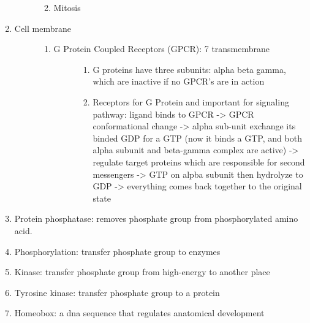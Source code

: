 \documentclass[letterpaper,10pt,english]{sphinxmanual}
\begin{document}
\begin{enumerate}
\begin{description}
\begin{enumerate}
\begin{description}
\begin{enumerate}
\end{enumerate}

\end{description}

\item {} 
Mitosis

\end{enumerate}

\end{description}

\item {} \begin{description}
\item[{Cell membrane}] \leavevmode\begin{enumerate}
\item {} \begin{description}
\item[{G Protein Coupled Receptors (GPCR): 7 transmembrane}] \leavevmode\begin{enumerate}
\item {} 
G proteins have three subunits: alpha beta gamma, which are inactive if no GPCR’s are in action

\item {} 
Receptors for G Protein and important for signaling pathway: ligand binds to GPCR -\textgreater{} GPCR conformational change -\textgreater{} alpha sub-unit exchange its binded GDP for a GTP (now it binds a GTP, and both alpha subunit and beta-gamma complex are active) -\textgreater{} regulate target proteins which are responsible for second messengers -\textgreater{} GTP on alpba subunit then hydrolyze to GDP -\textgreater{} everything comes back together to the original state

\end{enumerate}

\end{description}

\end{enumerate}

\end{description}

\item {} 
Protein phosphatase: removes phosphate group from phosphorylated amino acid.

\item {} 
Phosphorylation: transfer phosphate group to enzymes

\item {} 
Kinase: transfer phosphate group from high-energy to another place

\item {} 
Tyrosine kinase: transfer phosphate group to a protein

\item {} 
Homeobox: a dna sequence that regulates anatomical development

\end{enumerate}
\end{document}

